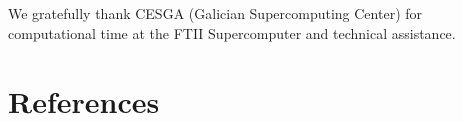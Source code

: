 \documentclass[review]{elsarticle}
\begin{document}
We gratefully thank CESGA (Galician Supercomputing Center) for computational time at the FTII Supercomputer and technical assistance.













\section{References}



\appendix
% 
% 
% 
% 
% 
% 
\end{document}
